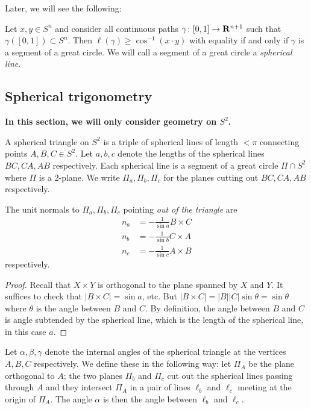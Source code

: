 \documentclass[12pt]{article}
\begin{document}
Later, we will see the following:

\begin{thm}
  Let $x,y\in S^n$ and consider all continuous paths $\gamma\colon[0,1]\to\mathbf{R}^{n+1}$ such that $\gamma([0,1])\subset S^n$. Then $\ell(\gamma)\geq \cos^{-1}(x\cdot y)$ with equality if and only if $\gamma$ is a segment of a great circle. We will call a segment of a great circle a {\em spherical line}.
\end{thm}

\subsection{Spherical trigonometry}

{\bf In this section, we will only consider geometry on $S^2$.}

\begin{dfn}
  A spherical triangle on $S^2$ is a triple of spherical lines of length $<\pi$ connecting points $A,B,C\in S^2$. Let $a,b,c$ denote the lengths of the spherical lines $BC,CA,AB$ respectively. Each spherical line is a segment of a great circle $\Pi\cap S^2$ where $\Pi$ is a 2-plane. We write $\Pi_a,\Pi_b,\Pi_c$ for the planes cutting out $BC,CA,AB$ respectively.
\end{dfn}

\begin{lma}
  The unit normals to $\Pi_a,\Pi_b,\Pi_c$ pointing {\em out of the triangle} are
  \begin{align*}
    n_a&=-\frac{1}{\sin a}B\times C\\
    n_b&=-\frac{1}{\sin b}C\times A\\
    n_c&=-\frac{1}{\sin c}A\times B
  \end{align*}
  respectively.
\end{lma}
\begin{proof}
Recall that $X\times Y$ is orthogonal to the plane spanned by $X$ and $Y$. It suffices to check that $|B\times C|=\sin a$, etc. But $|B\times C|=|B||C|\sin\theta=\sin\theta$ where $\theta$ is the angle between $B$ and $C$. By definition, the angle between $B$ and $C$ is angle subtended by the spherical line, which is the length of the spherical line, in this case $a$.
\end{proof}

\begin{dfn}
Let $\alpha,\beta,\gamma$ denote the internal angles of the spherical triangle at the vertices $A,B,C$ respectively. We define these in the following way: let $\Pi_A$ be the plane orthogonal to $A$; the two planes $\Pi_b$ and $\Pi_c$ cut out the spherical lines passing through $A$ and they intersect $\Pi_A$ in a pair of lines $\ell_b$ and $\ell_c$ meeting at the origin of $\Pi_A$. The angle $\alpha$ is then the angle between $\ell_b$ and $\ell_c$.
\end{dfn}
\end{document}
